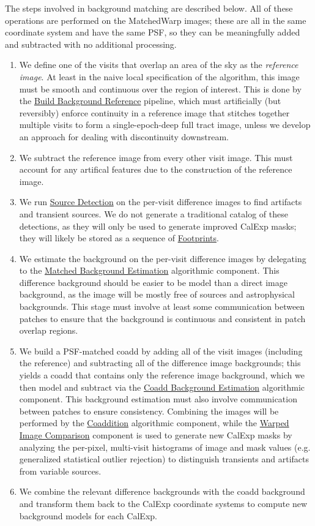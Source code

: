The steps involved in background matching are described below.  All of these operations are performed on the MatchedWarp images; these are all in the same coordinate system and have the same PSF, so they can be meaningfully added and subtracted with no additional processing.
\begin{enumerate}
\item We define one of the visits that overlap an area of the sky as the \emph{reference image}.  At least in the naive local specification of the algorithm, this image must be smooth and continuous over the region of interest.  This is done by the \hyperref[sec:acBuildBackgroundReference]{Build Background Reference} pipeline, which must artificially (but reversibly) enforce continuity in a reference image that stitches together multiple visits to form a single-epoch-deep full tract image, unless we develop an approach for dealing with discontinuity downstream.
\item We subtract the reference image from every other visit image.  This must account for any artifical features due to the construction of the reference image.
\item We run \hyperref[sec:acSourceDetection]{Source Detection} on the per-visit difference images to find artifacts and transient sources.  We do not generate a traditional catalog of these detections, as they will only be used to generate improved CalExp masks; they will likely be stored as a sequence of \hyperref[sec:spFootprints]{Footprints}.
\item We estimate the background on the per-visit difference images by delegating to the \hyperref[sec:acMatchedBackgroundEstimation]{Matched Background Estimation} algorithmic component.  This difference background should be easier to be model than a direct image background, as the image will be mostly free of sources and astrophysical backgrounds.  This stage must involve at least some communication between patches to ensure that the background is continuous and consistent in patch overlap regions.
\item We build a PSF-matched coadd by adding all of the visit images (including the reference) and subtracting all of the difference image backgrounds; this yields a coadd that contains only the reference image background, which we then model and subtract via the \hyperref[sec:acCoaddBackgroundEstimation]{Coadd Background Estimation} algorithmic component.  This background estimation must also involve communication between patches to ensure consistency.  Combining the images will be performed by the \hyperref[sec:acCoaddition]{Coaddition} algorithmic component, while the \hyperref[sec:acWarpedImageArtifactDetection]{Warped Image Comparison} component is used to generate new CalExp masks by analyzing the per-pixel, multi-visit histograms of image and mask values (e.g. generalized statistical outlier rejection) to distinguish transients and artifacts from variable sources.
\item We combine the relevant difference backgrounds with the coadd background and transform them back to the CalExp coordinate systems to compute new background models for each CalExp.
\end{enumerate}

